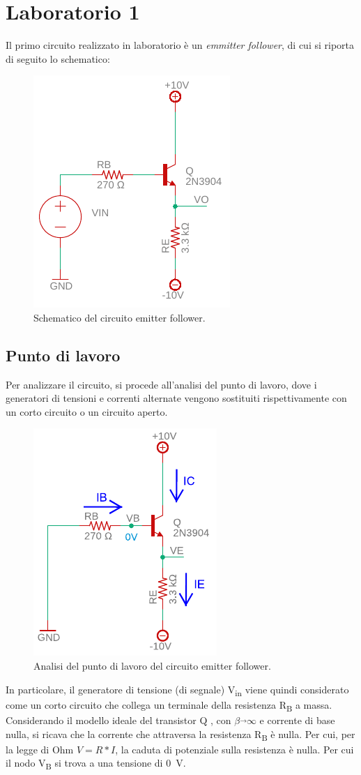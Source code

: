 \chapter{Laboratorio 1}
Il primo circuito realizzato in laboratorio è un \textit{emmitter follower}, di cui si riporta di seguito lo schematico:
\begin{figure}[h!]
	\centering
	\includegraphics[width=0.4\linewidth]{./OtherFiles/Laboratorio 1/emitter follower}
	\caption{Schematico del circuito emitter follower.}
	\label{fig:emitterfollwer}
\end{figure}
\section{Punto di lavoro}
Per analizzare il circuito, si procede all'analisi del punto di lavoro, dove i generatori di tensioni e correnti alternate vengono sostituiti rispettivamente con un corto circuito o un circuito aperto.
\begin{figure}[h!]
	\centering
	\includegraphics[width=0.4\linewidth]{./OtherFiles/Laboratorio 1/emitter follower_punto di lavoro_printout}
	\caption{Analisi del punto di lavoro del circuito emitter follower.}
	\label{fig:emitterfollwer_puntodilavoro}
\end{figure}
In particolare, il generatore di tensione (di segnale) V\textsubscript{in} viene quindi considerato come un corto circuito che collega un terminale della resistenza R\textsubscript{B} a massa. Considerando il modello ideale del transistor Q , con $\beta\overrightarrow{}\infty$ e corrente di base nulla, si ricava che la corrente che attraversa la resistenza R\textsubscript{B} è nulla. Per cui, per la legge di Ohm $V=R*I$, la caduta di potenziale sulla resistenza è nulla. Per cui il nodo V\textsubscript{B} si trova a una tensione di \SI{0}{\volt}. 

